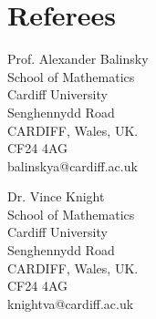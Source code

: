 \documentclass[a4paper]{article}
\begin{document}
\section{Referees}

\begin{minipage}[b]{0.5\linewidth}
Prof. Alexander Balinsky\\
School of Mathematics\\
Cardiff University\\
Senghennydd Road\\
CARDIFF, Wales, UK.\\
CF24 4AG\\
balinskya@cardiff.ac.uk
\end{minipage}
%
%
\begin{minipage}[b]{0.5\linewidth}
Dr. Vince Knight\\
School of Mathematics\\
Cardiff University\\
Senghennydd Road\\
CARDIFF, Wales, UK.\\
CF24 4AG\\
knightva@cardiff.ac.uk
\end{minipage}






\end{document}
